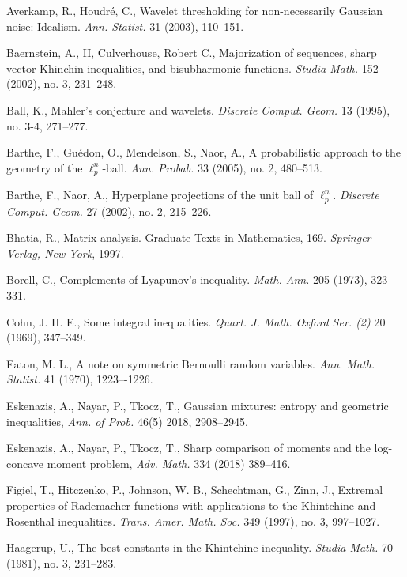 \documentclass[10pt]{article}
\newcommand{\1}{\textbf{1}}
\theoremstyle{remark}
\theoremstyle{definition}
\begin{document}
\begin{thebibliography}{9}


Averkamp, R., Houdr\'e, C., Wavelet thresholding for non-necessarily Gaussian noise: Idealism. \emph{Ann. Statist.} 31 (2003), 110--151. 


Baernstein, A., II, Culverhouse, Robert C.,
Majorization of sequences, sharp vector Khinchin inequalities, and bisubharmonic functions. 
\emph{Studia Math.} 152 (2002), no. 3, 231--248. 




Ball, K.,
Mahler's conjecture and wavelets. 
\emph{Discrete Comput. Geom.} 13 (1995), no. 3-4, 271--277. 



Barthe, F., Gu\'edon, O., Mendelson, S., Naor, A.,
A probabilistic approach to the geometry of the $\ell_p^n$-ball. 
\emph{Ann. Probab.} 33 (2005), no. 2, 480--513. 



Barthe, F., Naor, A.,
Hyperplane projections of the unit ball of $\ell_p^n$. 
\emph{Discrete Comput. Geom.} 27 (2002), no. 2, 215--226. 

Bhatia, R.,
Matrix analysis. 
Graduate Texts in Mathematics, 169. \emph{Springer-Verlag, New York}, 1997.


Borell, C.,
Complements of Lyapunov's inequality.
\emph{Math. Ann.} 205 (1973), 323--331.


Cohn, J. H. E., 
Some integral inequalities. \emph{Quart. J. Math. Oxford Ser. (2)} 20 (1969), 347--349.


Eaton, M. L.,
A note on symmetric Bernoulli random variables.
\emph{Ann. Math. Statist.} 41 (1970), 1223–-1226. 


Eskenazis, A., Nayar, P., Tkocz, T.,
Gaussian mixtures: entropy and geometric inequalities, \emph{Ann. of Prob.} 46(5) 2018, 2908--2945.


Eskenazis, A., Nayar, P., Tkocz, T.,
Sharp comparison of moments and the log-concave moment problem, \emph{Adv. Math.} 334 (2018) 389--416.


Figiel, T., Hitczenko, P., Johnson, W. B., Schechtman, G., Zinn, J.,
Extremal properties of Rademacher functions with applications to the Khintchine and Rosenthal inequalities. 
\emph{Trans. Amer. Math. Soc.} 349 (1997), no. 3, 997--1027. 


Haagerup, U.,
The best constants in the Khintchine inequality.
\emph{Studia Math.} 70 (1981), no. 3, 231--283.


\end{thebibliography}
\end{document}
